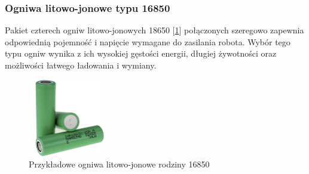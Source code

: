\subsubsection*{Ogniwa litowo-jonowe typu 16850}
Pakiet czterech ogniw litowo-jonowych 18650 [\ref{zdj:ogniwa}] połączonych szeregowo zapewnia odpowiednią pojemność i napięcie wymagane do zasilania robota. Wybór tego typu ogniw wynika z ich wysokiej gęstości energii, długiej żywotności oraz możliwości łatwego ładowania i wymiany.

\begin{figure}[H]
        \centering
        \includegraphics[width=0.3\textwidth]{./graf/ogniwa.png}
        \caption{Przykładowe ogniwa litowo-jonowe rodziny 16850}
        \label{zdj:ogniwa}
\end{figure}

\clearpage

    
